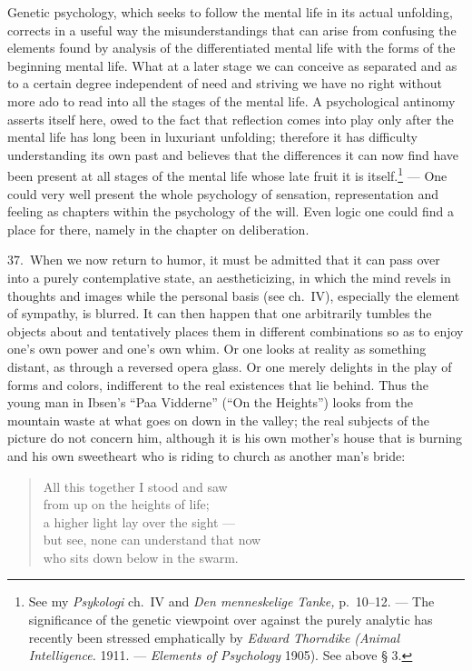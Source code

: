 \documentclass[12pt]{book}
\newcommand{\opage}[1]{\marginnote{\footnotesize\textit{[#1]}}}
\begin{document}
Genetic psychology, which seeks to follow the mental life in its actual unfolding, corrects
in a useful way the misunderstandings that can arise from confusing the elements found by
analysis of the differentiated mental life with the forms of the beginning mental life. What
at a later stage we can conceive as separated and as to a certain degree independent of need
and striving we have no right without more ado to read into all the stages of the mental
life. A psychological antinomy asserts itself here, owed to the fact that reflection comes
into play only after the mental life has long been in luxuriant unfolding; therefore it has
difficulty understanding its own past and believes that the differences it can now find have
been present at all stages of the mental life whose late fruit it is itself.\footnote{See my
\textit{Psykologi} ch.~IV and \textit{Den menneskelige Tanke,} p.~10--12. --- The
significance of the genetic viewpoint over against the purely analytic has recently been
stressed emphatically by \textit{Edward Thorndike (Animal Intelligence.} 1911. ---
\textit{Elements of Psychology} 1905). See above § 3.} --- One could very well present the
whole psychology of sensation, representation and feeling as chapters within the psychology
of the will. Even logic one could find a place for there, namely in the chapter on
deliberation.

37.~When we now return to humor, it must be admitted that it can pass over into a purely
contemplative state, an aestheticizing, in which the mind revels in thoughts and images
while the personal basis (see ch.~IV), especially the element of sympathy, is blurred. It
can then happen that one arbitrarily tumbles the objects about and tentatively places them in
different combinations so as to enjoy one's own power and one's own whim. Or one looks at
reality as something distant, as through a reversed opera glass. Or one merely delights in
the play of forms and colors, indifferent to the real existences that lie behind. Thus the
young man in Ibsen's ``Paa Vidderne'' (``On the Heights'') looks from the mountain waste at
what goes on down in the valley; the real subjects of the picture do not concern him,
although it is his own \opage{127}mother's house that is burning and his own sweetheart who
is riding to church as another man's bride:

\begin{quote}
All this together I stood and saw\\
from up on the heights of life;\\
a higher light lay over the sight ---\\
but see, none can understand that now\\
who sits down below in the swarm.
\end{quote}
\end{document}
